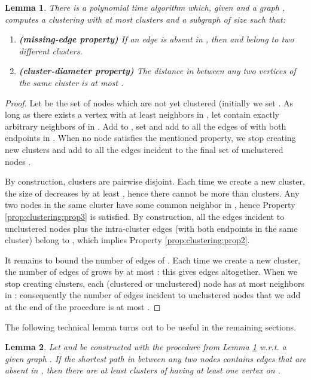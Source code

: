 \documentclass[a4paper,11pt]{article}
\newtheorem{lemma}{Lemma}[section]
\theoremstyle{definition}
\begin{document}
\begin{lemma}
\label{lem:clustering}
There is a polynomial time algorithm which,
given  and a graph , computes a clustering  with at most  clusters and a subgraph  of size  such that:
\begin{enumerate}
\item \label{prop:clustering:prop2} {\bf (missing-edge property)} If an edge  is absent in , then  and  belong to two different clusters.
  \item \label{prop:clustering:prop3} {\bf (cluster-diameter property)} The distance in  between any two vertices of the same cluster is at most .
\end{enumerate}
\end{lemma}
\begin{proof}
Let  be the set of nodes which are not yet clustered (initially we set .
As long as there exists a vertex  with at least  neighbors in , let  contain exactly  arbitrary
neighbors of  in .
Add  to , set  and add to  
all the edges of  with both endpoints in . 
When no node  satisfies the mentioned property, we stop creating new clusters and add to  all the edges incident to the final set of unclustered nodes .

By construction, clusters are pairwise disjoint. Each time we create a new cluster, the size of  decreases by at least , hence there cannot be more than  clusters. Any two nodes in the same cluster  have some common neighbor  in , hence Property \ref{prop:clustering:prop3} is satisfied. By construction, all the edges incident to unclustered nodes plus the intra-cluster edges (with both endpoints in the same cluster) belong to , which implies Property \ref{prop:clustering:prop2}.

It remains to bound the number of edges of . Each time we create a new cluster, the number of edges of  grows by at most : this gives  edges altogether. When we stop creating clusters, each (clustered or unclustered) node  has at most  neighbors in : consequently the number of edges incident to unclustered nodes that we add at the end of the procedure is at most .  
\end{proof}





The following technical lemma turns out to be useful in the remaining sections.
\begin{lemma}
\label{lem:num-clusters}
Let  and  be constructed with the procedure from Lemma \ref{lem:clustering} w.r.t. a given graph . If the shortest path  in  between any two nodes  contains  edges that are absent in , 
then there are at least  clusters of 
having at least one vertex on .
\end{lemma}
\end{document}
